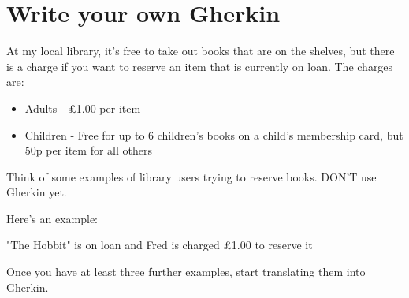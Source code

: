 \section*{Write your own Gherkin}

\begin{framed}
At my local library, it's free to take out books that are on the shelves, but there is a charge if you want to reserve an item that is currently on loan. The charges are:

\begin{itemize}
    \item Adults - \pounds 1.00 per item
    \item Children - Free for up to 6 children's books on a child's membership card, but 50p per item for all others
\end{itemize}
\end{framed}


Think of some examples of library users trying to reserve books. DON'T use Gherkin yet. 

Here's an example:

\hspace{2cm} "The Hobbit" is on loan and Fred is charged \pounds 1.00 to reserve it

Once you have at least three further examples, start translating them into Gherkin.